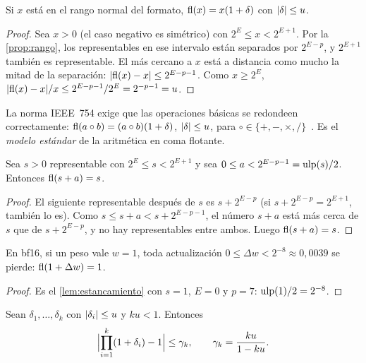 \begin{teorema}\label{teo:redondeo}
Si $x$ está en el rango normal del formato, $\operatorname{fl}(x)=x(1+\delta)$ con $\lvert\delta\rvert\le u$.
\end{teorema}

\begin{proof}
Sea $x>0$ (el caso negativo es simétrico) con $2^{E}\le x<2^{E+1}$. Por la \cref{prop:rango}, los representables en ese intervalo están separados por $2^{E-p}$, y $2^{E+1}$ también es representable. El más cercano a $x$ está a distancia como mucho la mitad de la separación: $\lvert\operatorname{fl}(x)-x\rvert\le 2^{E-p-1}$. Como $x\ge 2^{E}$, $\lvert\operatorname{fl}(x)-x\rvert/x\le 2^{E-p-1}/2^{E}=2^{-p-1}=u$.
\end{proof}

La norma IEEE~754 exige que las operaciones básicas se redondeen correctamente: $\operatorname{fl}(a\circ b)=(a\circ b)(1+\delta)$, $\lvert\delta\rvert\le u$, para $\circ\in\{+,-,\times,/\}$~\cite[cap.~2]{higham}. Es el \emph{modelo estándar} de la aritmética en coma flotante.

\begin{lema}[Estancamiento]\label{lem:estancamiento}
Sea $s>0$ representable con $2^{E}\le s<2^{E+1}$ y sea $0\le a<2^{E-p-1}=\operatorname{ulp}(s)/2$. Entonces $\operatorname{fl}(s+a)=s$.
\end{lema}

\begin{proof}
El siguiente representable después de $s$ es $s+2^{E-p}$ (si $s+2^{E-p}=2^{E+1}$, también lo es). Como $s\le s+a<s+2^{E-p-1}$, el número $s+a$ está más cerca de $s$ que de $s+2^{E-p}$, y no hay representables entre ambos. Luego $\operatorname{fl}(s+a)=s$.
\end{proof}

\begin{corolario}\label{cor:actualizacion}
En bf16, si un peso vale $w=1$, toda actualización $0\le\Delta w<2^{-8}\approx 0{,}0039$ se pierde: $\operatorname{fl}(1+\Delta w)=1$.
\end{corolario}

\begin{proof}
Es el \cref{lem:estancamiento} con $s=1$, $E=0$ y $p=7$: $\operatorname{ulp}(1)/2=2^{-8}$.
\end{proof}

\begin{lema}\label{lem:gamma}
Sean $\delta_1,\dots,\delta_k$ con $\lvert\delta_i\rvert\le u$ y $ku<1$. Entonces
\[
\Bigl\lvert\prod_{i=1}^{k}(1+\delta_i)-1\Bigr\rvert\le\gamma_k,\qquad\gamma_k=\frac{ku}{1-ku}.
\]
\end{lema}

